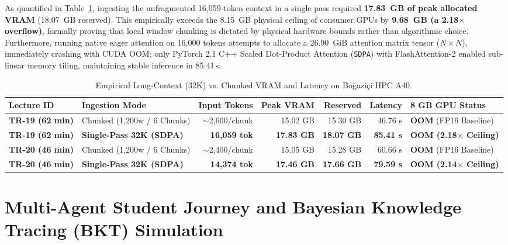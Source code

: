 \documentclass[a4paper,12pt]{report}
\begin{document}
As quantified in Table~\ref{tab:long_context_dag}, ingesting the unfragmented 16,059-token context in a single pass required \textbf{17.83~GB of peak allocated VRAM} (18.07~GB reserved). This empirically exceeds the 8.15~GB physical ceiling of consumer GPUs by \textbf{9.68~GB (a 2.18$\times$ overflow)}, formally proving that local window chunking is dictated by physical hardware bounds rather than algorithmic choice. Furthermore, running native eager attention on 16,000 tokens attempts to allocate a 26.90~GiB attention matrix tensor ($N \times N$), immediately crashing with CUDA OOM; only PyTorch 2.1 C++ Scaled Dot-Product Attention (\texttt{SDPA}) with FlashAttention-2 enabled sub-linear memory tiling, maintaining stable inference in 85.41\,s.

\begin{table}[htbp]
\centering
\small
\caption{Empirical Long-Context (32K) vs. Chunked VRAM and Latency on Bo\u{g}azi\c{c}i HPC A40.}
\label{tab:long_context_dag}
\footnotesize\setlength{\tabcolsep}{3pt}
\begin{tabularx}{\textwidth}{>{\RaggedRight\arraybackslash}X>{\RaggedRight\arraybackslash}Xrrrr>{\RaggedRight\arraybackslash}X}
\toprule
\textbf{Lecture ID} & \textbf{Ingestion Mode} & \textbf{Input Tokens} & \textbf{Peak VRAM} & \textbf{Reserved} & \textbf{Latency} & \textbf{8 GB GPU Status} \\
\midrule
\textbf{TR-19 (62 min)} & Chunked (1,200w / 6 Chunks) & $\sim$2,600/chunk & 15.02 GB & 15.30 GB & 46.76 s & \textbf{OOM} (FP16 Baseline) \\
\textbf{TR-19 (62 min)} & \textbf{Single-Pass 32K (SDPA)} & \textbf{16,059 tok} & \textbf{17.83 GB} & \textbf{18.07 GB} & \textbf{85.41 s} & \textbf{OOM (2.18$\times$ Ceiling)} \\
\midrule
\textbf{TR-20 (46 min)} & Chunked (1,200w / 6 Chunks) & $\sim$2,400/chunk & 15.05 GB & 15.28 GB & 60.66 s & \textbf{OOM} (FP16 Baseline) \\
\textbf{TR-20 (46 min)} & \textbf{Single-Pass 32K (SDPA)} & \textbf{14,374 tok} & \textbf{17.46 GB} & \textbf{17.66 GB} & \textbf{79.59 s} & \textbf{OOM (2.14$\times$ Ceiling)} \\
\bottomrule
\end{tabularx}
\end{table}

\section{Multi-Agent Student Journey and Bayesian Knowledge Tracing (BKT) Simulation}
\label{sec:student_journey_simulation}
\end{document}
